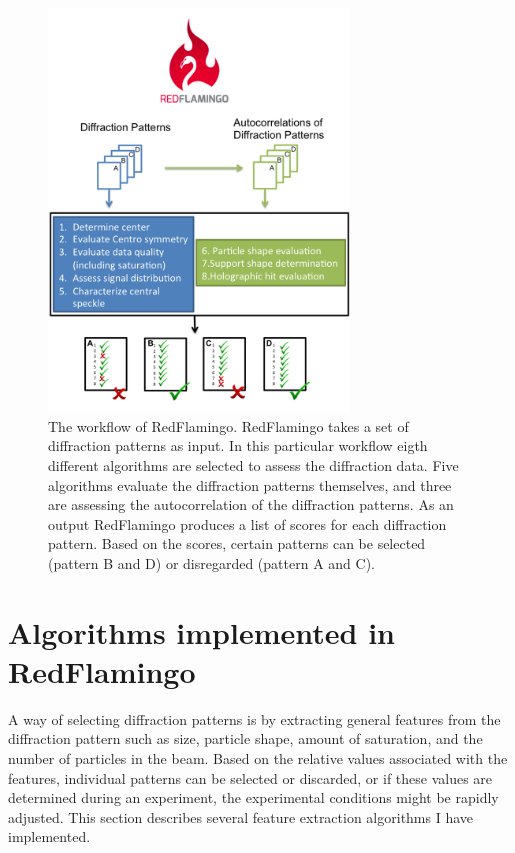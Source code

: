 \begin{figure}[!h]
\centering
\includegraphics[width=80mm]{Chapter_08_RedFlamingo_Workflow.png}
\caption{The workflow of RedFlamingo. RedFlamingo takes a set of diffraction patterns as input. In this particular workflow eigth different algorithms are selected to assess the diffraction data. Five algorithms evaluate the diffraction patterns themselves, and three are assessing the autocorrelation of the diffraction patterns. As an output RedFlamingo produces a list of scores for each diffraction pattern. Based on the scores, certain patterns can be selected (pattern B and D) or disregarded (pattern A and C). }\label{fig:workflow}
\end{figure}

\section{Algorithms implemented in RedFlamingo}
A way of selecting diffraction patterns is by extracting general features from the diffraction pattern such as size, particle shape, amount of saturation, and the number of particles in the beam. Based on the relative values associated with the features, individual patterns can be selected or discarded, or if these values are determined during an experiment, the experimental conditions might be rapidly adjusted. This section describes several feature extraction algorithms I have implemented.

